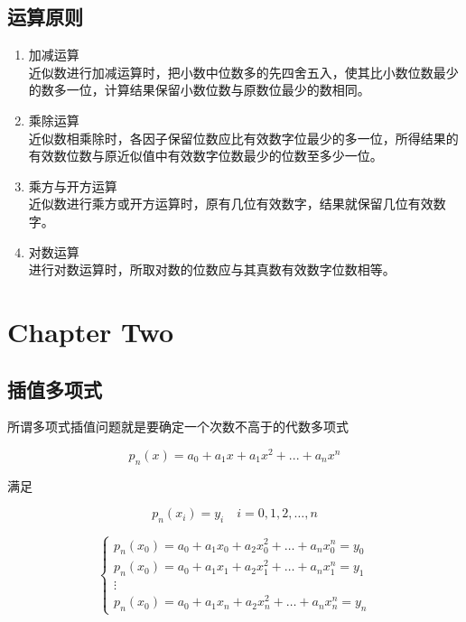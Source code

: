 \documentclass[12pt]{report}
\numberwithin{equation}{section}
\begin{document}
	\subsection{运算原则}
	\begin{enumerate}
        \item 加减运算  \\
		近似数进行加减运算时，把小数中位数多的先四舍五入，使其比小数位数最少的数多一位，计算结果保留小数位数与原数位最少的数相同。
        \item 乘除运算  \\
        近似数相乘除时，各因子保留位数应比有效数字位最少的多一位，所得结果的有效数位数与原近似值中有效数字位数最少的位数至多少一位。
        \item 乘方与开方运算  \\
        近似数进行乘方或开方运算时，原有几位有效数字，结果就保留几位有效数字。
        \item 对数运算  \\
        进行对数运算时，所取对数的位数应与其真数有效数字位数相等。
	\end{enumerate}

	\section{Chapter Two}

	\subsection{插值多项式}
	所谓多项式插值问题就是要确定一个次数不高于的代数多项式  

	\begin{equation}
		p_n (x) = a_0+a_1x + a_1x^2 +...+ a_nx^n
	\end{equation}  

	满足  

	\begin{equation}
		p_n (x_i) = y_i \quad i = 0, 1, 2, \ldots , n
	\end{equation}

	\begin{equation}
		\begin{cases}
			p_n (x_0) = a_0 + a_1 x_0 + a_2 x_0^2 + \ldots + a_n x_0^n = y_0  \\
			p_n (x_0) = a_0 + a_1 x_1 + a_2 x_1^2 + \ldots + a_n x_1^n = y_1 \\
			\vdots  \\
			p_n (x_0) = a_0 + a_1 x_n + a_2 x_n^2 + \ldots + a_n x_n^n = y_n
		\end{cases}
	\end{equation}
\end{document}
